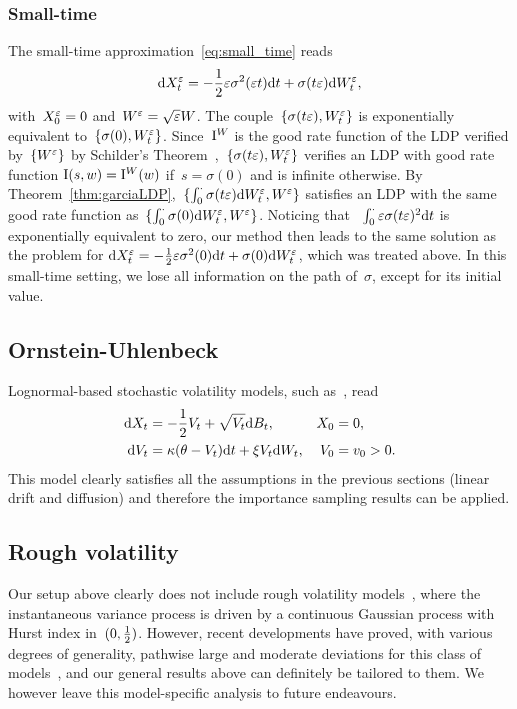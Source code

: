 \subsubsection{Small-time}
The small-time approximation~\eqref{eq:small_time} reads
$$\mathrm{d} X_t^{\varepsilon} = -\frac{1}{2}\varepsilon\sigma^2(\varepsilon t)\mathrm{d} t + \sigma(t\varepsilon) \mathrm{d} W_t^{\varepsilon},$$
with~$X_0 ^{\varepsilon} = 0$ and~$W^{\varepsilon} = \sqrt{\varepsilon}W$.
The couple~$\{\sigma(t\varepsilon), W_t^\varepsilon\}$ is exponentially equivalent to~$\{\sigma(0),W_t^\varepsilon\}$. 
Since~$\mathrm{I}^{W}$ is the good rate function of the LDP verified by~$\{W^\varepsilon\}$ by Schilder's Theorem~\cite[Theorem 5.2.3]{Dembo2010LargeApplications},~$\{\sigma(t\varepsilon), W_t^\varepsilon\}$ verifies an LDP with good rate function
$\mathrm{I}(s,w) = \mathrm{I}^{W}(w)$
if~$s = \sigma(0)$ and is infinite otherwise.
By Theorem~\ref{thm:garciaLDP},~$\{\int_0^\cdot\sigma(t\varepsilon)\mathrm{d} W_t^\varepsilon,W^\varepsilon\}$ satisfies an LDP with the same good rate function as~$\{\int_0^\cdot\sigma(0)\mathrm{d} W_t^\varepsilon,W^\varepsilon\}$. 
Noticing that ~$\int_0^\cdot \varepsilon \sigma(t\varepsilon)^2\mathrm{d} t$ is exponentially equivalent to zero, our method then leads to the same solution as the problem for 
$\mathrm{d} X_t^{\varepsilon} = -\frac{1}{2}\varepsilon\sigma^2(0)\mathrm{d} t + \sigma(0) \mathrm{d} W_t^{\varepsilon}$,
which was treated above. 
In this small-time setting, we lose all information on the path of~$\sigma$, except for its initial value.



\subsection{Ornstein-Uhlenbeck}\label{sec:OU}
Lognormal-based stochastic volatility models, 
such as~\cite{Sepp2012BetaModel}, read
\begin{equation}\label{eq:LogNormalVol}
\begin{aligned}
    \mathrm{d} X_t &= -\frac12 V_t + \sqrt{V_t}\mathrm{d} B_t, & X_0 &= 0,\\
    \mathrm{d} V_t &= \kappa (\theta - V_t)\mathrm{d} t + \xi V_t\mathrm{d} W_t, & V_0 &= v_0 > 0.
\end{aligned}
\end{equation}
This model clearly satisfies all the assumptions in the previous sections (linear drift and diffusion)
and therefore the importance sampling results can be applied.

\subsection{Rough volatility}\label{sec:RoughVol}
Our setup above clearly does not include rough volatility models~\cite{Gatheral2018VolatilityRough}, where the instantaneous variance process is driven by a continuous Gaussian process with Hurst index in~$(0,\frac{1}{2})$.
However, recent developments have proved, with various degrees of generality,
pathwise large and moderate deviations for this class of models~\cite{Gerhold2021PathwiseCorrigendum, Gulisashvili2018LargeModels, Gulisashvili2021Time-inhomogeneousRoughness, Jacquier2018PathwiseModel, Jacquier2022LargeSystems},
and our general results above can definitely be tailored to them.
We however leave this model-specific analysis to future endeavours.

